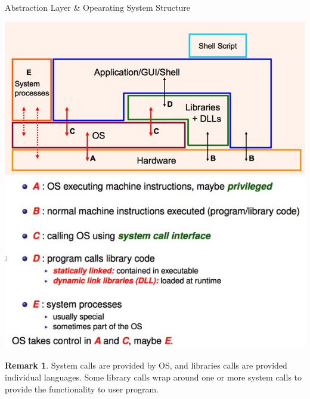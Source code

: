 \documentclass[11pt,a4paper]{article}
\theoremstyle{definition}
\newtheorem*{remark}{Remark}
\begin{document}
\begin{tcolorbox}
	\textsf{Abstraction Layer \& Opearating System Structure}
	
	\includegraphics[scale=0.25]{m1/operatingSystemStructure}
		\centering
	\includegraphics[scale=0.35]{m1/abstractionLayerDescription}
		\centering
\end{tcolorbox}

\begin{remark}
	System calls are provided by OS, and libraries calls are provided individual languages. Some library calls wrap around one or more system calls to provide the functionality to user program.
\end{remark}
\end{document}

